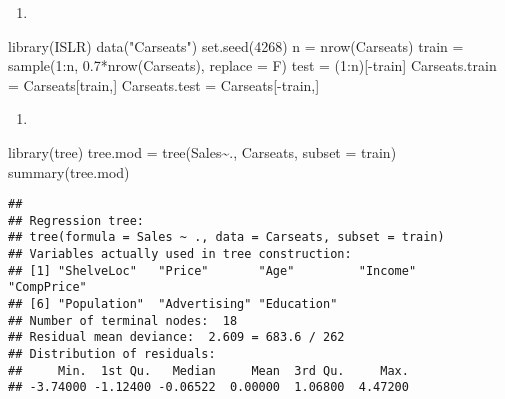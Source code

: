 \documentclass[
]{article}
\newenvironment{Shaded}{\begin{snugshade}}{\end{snugshade}}
\newcommand{\AttributeTok}[1]{\textcolor[rgb]{0.77,0.63,0.00}{#1}}
\newcommand{\DecValTok}[1]{\textcolor[rgb]{0.00,0.00,0.81}{#1}}
\newcommand{\FloatTok}[1]{\textcolor[rgb]{0.00,0.00,0.81}{#1}}
\newcommand{\FunctionTok}[1]{\textcolor[rgb]{0.00,0.00,0.00}{#1}}
\newcommand{\NormalTok}[1]{#1}
\newcommand{\OtherTok}[1]{\textcolor[rgb]{0.56,0.35,0.01}{#1}}
\newcommand{\SpecialCharTok}[1]{\textcolor[rgb]{0.00,0.00,0.00}{#1}}
\newcommand{\StringTok}[1]{\textcolor[rgb]{0.31,0.60,0.02}{#1}}
\providecommand{\tightlist}{%
  \setlength{\itemsep}{0pt}\setlength{\parskip}{0pt}}
\begin{document}
\begin{enumerate}
\def\labelenumi{\alph{enumi})}
\tightlist
\item
\end{enumerate}

\begin{Shaded}
\begin{Highlighting}[]
\FunctionTok{library}\NormalTok{(ISLR)}
\FunctionTok{data}\NormalTok{(}\StringTok{"Carseats"}\NormalTok{)}
\FunctionTok{set.seed}\NormalTok{(}\DecValTok{4268}\NormalTok{)}
\NormalTok{n }\OtherTok{=} \FunctionTok{nrow}\NormalTok{(Carseats)}
\NormalTok{train }\OtherTok{=} \FunctionTok{sample}\NormalTok{(}\DecValTok{1}\SpecialCharTok{:}\NormalTok{n, }\FloatTok{0.7}\SpecialCharTok{*}\FunctionTok{nrow}\NormalTok{(Carseats), }\AttributeTok{replace =}\NormalTok{ F)}
\NormalTok{test }\OtherTok{=}\NormalTok{ (}\DecValTok{1}\SpecialCharTok{:}\NormalTok{n)[}\SpecialCharTok{{-}}\NormalTok{train]}
\NormalTok{Carseats.train }\OtherTok{=}\NormalTok{ Carseats[train,]}
\NormalTok{Carseats.test }\OtherTok{=}\NormalTok{ Carseats[}\SpecialCharTok{{-}}\NormalTok{train,]}
\end{Highlighting}
\end{Shaded}

\begin{enumerate}
\def\labelenumi{\alph{enumi})}
\setcounter{enumi}{1}
\tightlist
\item
\end{enumerate}

\begin{Shaded}
\begin{Highlighting}[]
\FunctionTok{library}\NormalTok{(tree)}
\NormalTok{tree.mod }\OtherTok{=} \FunctionTok{tree}\NormalTok{(Sales}\SpecialCharTok{\textasciitilde{}}\NormalTok{., Carseats, }\AttributeTok{subset =}\NormalTok{ train)}
\FunctionTok{summary}\NormalTok{(tree.mod)}
\end{Highlighting}
\end{Shaded}

\begin{verbatim}
## 
## Regression tree:
## tree(formula = Sales ~ ., data = Carseats, subset = train)
## Variables actually used in tree construction:
## [1] "ShelveLoc"   "Price"       "Age"         "Income"      "CompPrice"  
## [6] "Population"  "Advertising" "Education"  
## Number of terminal nodes:  18 
## Residual mean deviance:  2.609 = 683.6 / 262 
## Distribution of residuals:
##     Min.  1st Qu.   Median     Mean  3rd Qu.     Max. 
## -3.74000 -1.12400 -0.06522  0.00000  1.06800  4.47200
\end{verbatim}
\end{document}
